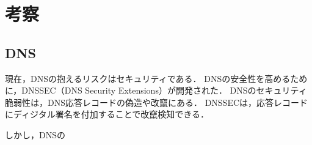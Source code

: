 \section{考察}
\subsection{DNS}
現在，DNSの抱えるリスクはセキュリティである．
DNSの安全性を高めるために，DNSSEC（DNS Security Extensions）が開発された．
DNSのセキュリティ脆弱性は，DNS応答レコードの偽造や改竄にある．
DNSSECは，応答レコードにディジタル署名を付加することで改竄検知できる．\par
しかし，DNSの